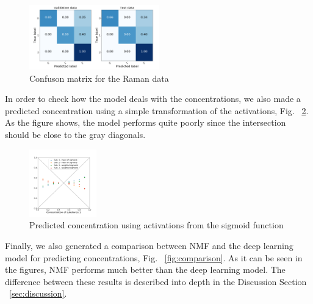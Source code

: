 \documentclass{article}
\begin{document}
\begin{figure}[H]
  \centering
  \includegraphics[width=0.5\textwidth]{raman_sim_3_conf_matrix13_2.png}
  \caption{Confuson matrix for the Raman data}
  \label{fig:confusion}
\end{figure}
%
In order to check how the model deals with the concentrations, we also made a predicted concentration using a simple transformation of the activations, Fig. ~\ref{fig:conc_sigmoids}. As the figure shows, the model performs quite poorly since the intersection should be close to the gray diagonals. %
\begin{figure}[H]
	\centering
	\includegraphics[width=0.26\textwidth]{DNN_pred_conc_sigmoid_2.png} 
	\caption{Predicted concentration using activations from the sigmoid function}
	\label{fig:conc_sigmoids}
\end{figure}
%
Finally, we also generated a comparison between NMF and the deep learning model for predicting concentrations, Fig. ~\ref{fig:comparison}. As it can be seen in the figures, NMF performs much better than the deep learning model. The difference between these results is described into depth in the Discussion Section ~\ref{sec:discussion}.
\end{document}
